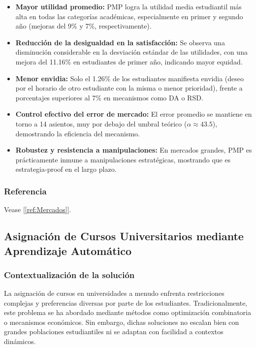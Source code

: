 \documentclass{article}
\begin{document}
\begin{itemize}
    \item \textbf{Mayor utilidad promedio:} PMP logra la utilidad media estudiantil más alta en todas las categorías académicas, especialmente en primer y segundo año (mejoras del 9\% y 7\%, respectivamente).

    \item \textbf{Reducción de la desigualdad en la satisfacción:} Se observa una disminución considerable en la desviación estándar de las utilidades, con una mejora del 11.16\% en estudiantes de primer año, indicando mayor equidad.

    \item \textbf{Menor envidia:} Solo el 1.26\% de los estudiantes manifiesta envidia (deseo por el horario de otro estudiante con la misma o menor prioridad), frente a porcentajes superiores al 7\% en mecanismos como DA o RSD.

    \item \textbf{Control efectivo del error de mercado:} El error promedio se mantiene en torno a 14 asientos, muy por debajo del umbral teórico ($\alpha \approx 43.5$), demostrando la eficiencia del mecanismo.

    \item \textbf{Robustez y resistencia a manipulaciones:} En mercados grandes, PMP es prácticamente inmune a manipulaciones estratégicas, mostrando que es estrategia-proof en el largo plazo.
\end{itemize}

\subsubsection{Referencia}

Vease [\ref{ref:Mercados}].

\subsection{Asignación de Cursos Universitarios mediante Aprendizaje Automático}

\subsubsection{Contextualización de la solución}

La asignación de cursos en universidades a menudo enfrenta restricciones complejas y preferencias diversas por parte de los estudiantes. Tradicionalmente, este problema se ha abordado mediante métodos como optimización combinatoria o mecanismos económicos. Sin embargo, dichas soluciones no escalan bien con grandes poblaciones estudiantiles ni se adaptan con facilidad a contextos dinámicos.
\end{document}

